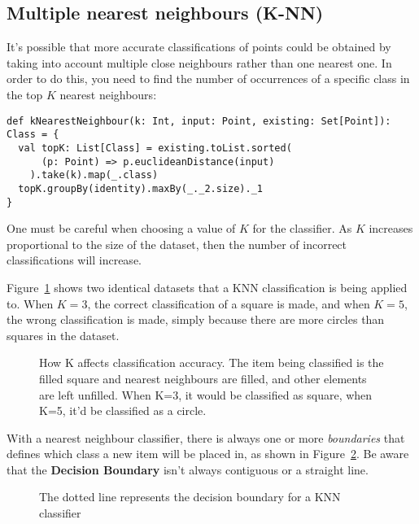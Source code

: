 \subsection{Multiple nearest neighbours (K-NN)}

It's possible that more accurate classifications of points could be obtained by
taking into account multiple close neighbours rather than one nearest one. In
order to do this, you need to find the number of occurrences of a specific class
in the top $K$ nearest neighbours:


\begin{lstlisting}[label=nearestNeighbourk, caption=Scala Nearest Neighbour]
def kNearestNeighbour(k: Int, input: Point, existing: Set[Point]): Class = {
  val topK: List[Class] = existing.toList.sorted(
      (p: Point) => p.euclideanDistance(input)
    ).take(k).map(_.class)
  topK.groupBy(identity).maxBy(_._2.size)._1
}
\end{lstlisting}

One must be careful when choosing a value of $K$ for the classifier. As $K$
increases proportional to the size of the dataset, then the number of incorrect
classifications will increase.

Figure~\ref{fig:knn-large} shows two identical datasets that a KNN
classification is being applied to. When $K = 3$, the correct classification of
a square is made, and when $K = 5$, the wrong classification is made, simply
because there are more circles than squares in the dataset.

\begin{figure}[!h]
  
  \caption{How K affects classification accuracy. The item being classified is
  the filled square and nearest neighbours are filled, and other elements are
  left unfilled. When K=3, it would be classified as square, when K=5, it'd be
  classified as a circle.}
  \label{fig:knn-large}
\end{figure}

With a nearest neighbour classifier, there is always one or more
\textit{boundaries} that defines which class a new item will be placed in, as
shown in Figure~\ref{fig:knn-boundary}. Be aware that the \textbf{Decision
Boundary} isn't always contiguous or a straight line.

\begin{figure}[!h]
  \centering
  
  \caption{The dotted line represents the decision boundary for a KNN
  classifier}
  \label{fig:knn-boundary}
\end{figure}


